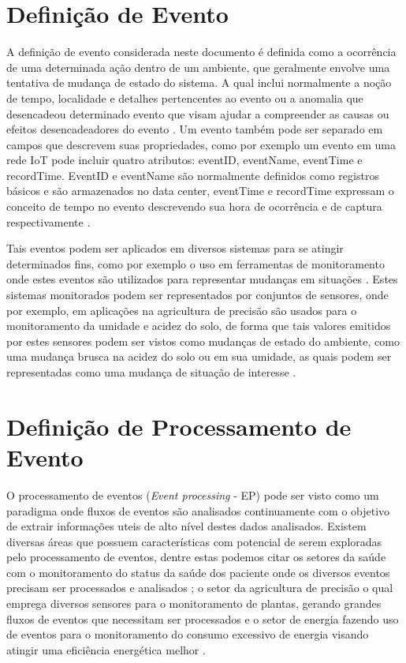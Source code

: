 \documentclass[tid,table]{texufpel} %
\begin{document}
\section{Definição de Evento}
A definição de evento considerada neste documento é definida como a ocorrência de uma determinada ação dentro de um ambiente, que geralmente envolve uma tentativa de mudança de estado do sistema. A qual inclui normalmente a noção de tempo, localidade e detalhes pertencentes ao evento ou a anomalia que desencadeou determinado evento que visam ajudar a compreender as causas ou efeitos desencadeadores do evento \cite{fitzgerald2010common}.
Um evento também pode ser separado em campos que descrevem suas propriedades, como por exemplo um evento em uma rede IoT pode incluir quatro atributos: eventID, eventName, eventTime e recordTime. EventID e eventName são normalmente definidos como registros básicos e são armazenados no data center, eventTime e recordTime expressam o conceito de tempo no evento descrevendo sua hora de ocorrência e de captura respectivamente \cite{minbo2013information}. 

Tais eventos podem ser aplicados em diversos sistemas para se atingir determinados fins, como por exemplo o uso em ferramentas de monitoramento onde estes eventos são utilizados para representar mudanças em situações \cite{etzion2011event}. Estes sistemas monitorados podem ser representados por conjuntos de sensores, onde por exemplo, em aplicações na agricultura de precisão são usados para o monitoramento da umidade e acidez do solo, de forma que tais valores emitidos por estes sensores podem ser vistos como mudanças de estado do ambiente, como uma mudança brusca na acidez do solo ou em sua umidade, as quais podem ser representadas como uma mudança de situação de interesse \cite{garcia2011wireless}.

\section{Definição de Processamento de Evento}
O processamento de eventos (\textit{Event processing} - EP) pode ser visto como um paradigma onde fluxos de eventos são analisados continuamente com o objetivo de extrair informações uteis de alto nível destes dados analisados. Existem diversas áreas que possuem características com potencial de serem exploradas pelo processamento de eventos, dentre estas podemos citar os setores da saúde com o monitoramento do status da saúde dos paciente onde os diversos eventos precisam ser processados e analisados \cite{weiner2008health}; o setor da agricultura de precisão o qual emprega diversos sensores para o monitoramento de plantas, gerando grandes fluxos de eventos que necessitam ser processados \cite{garcia2011wireless} e o setor de energia fazendo uso de eventos para o monitoramento do consumo excessivo de energia visando atingir uma eficiência energética melhor \cite{vijayaraghavan2010automated}. 
\end{document}
